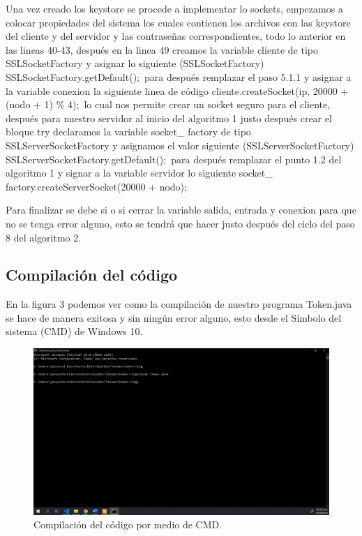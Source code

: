 \documentclass[11pt]{article}
\begin{document}
Una vez creado los keystore se procede a implementar lo sockets, empezamos a colocar propiedades del sistema los cuales contienen los archivos con las keystore del cliente y del servidor y las contraseñas correspondientes, todo lo anterior en las lineas 40-43, después en la linea 49 creamos la variable cliente de tipo SSLSocketFactory y asignar lo siguiente (SSLSocketFactory) SSLSocketFactory.getDefault()$;$ para después remplazar el paso 5.1.1 y asignar a la variable conexion la siguiente linea de código cliente.createSocket(ip, 20000 + (nodo + 1) \% 4)$;$ lo cual nos permite crear un socket seguro para el cliente, después para nuestro servidor al inicio del algoritmo 1 justo después crear el bloque try declaramos la variable socket\_ factory de tipo SSLServerSocketFactory y asignamos el valor siguiente (SSLServerSocketFactory) SSLServerSocketFactory.getDefault()$;$ para después remplazar el punto 1.2 del algoritmo 1 y signar a la variable servidor lo siguiente socket\_ factory.createServerSocket(20000 + nodo)$;$\par
Para finalizar se debe si o si cerrar la variable salida, entrada y conexion para que no se tenga error alguno, esto se tendrá que hacer justo después del ciclo del paso 8 del algoritmo 2. 
		\subsection{Compilación del código}
		En la figura 3 podemos ver como la compilación de nuestro programa Token.java se hace de manera exitosa y sin ningún error alguno, esto desde el Símbolo del sistema (CMD) de Windows 10.
		\begin{figure}[H]
			\centering
			\includegraphics[scale=0.34]{resources/compilacion.png}
			\caption{Compilación del código por medio de CMD. }\label{fig:picture}
		\end{figure}
\end{document}

